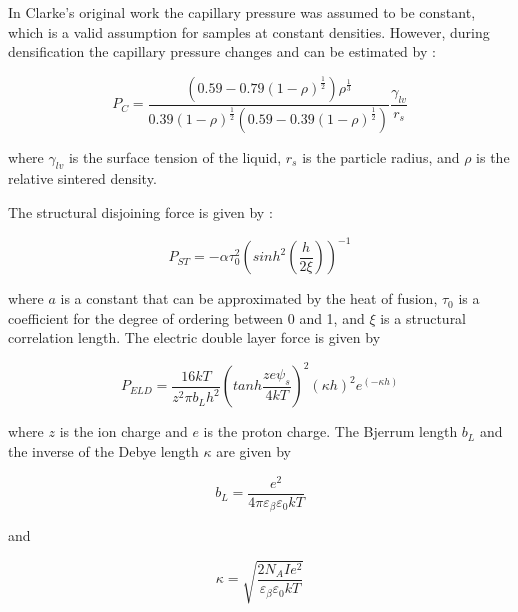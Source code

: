 In Clarke's original work the capillary pressure was assumed to be constant, which is a valid assumption for samples at constant densities. However, during densification the capillary pressure changes and can be estimated by \cite{Kwon1991}:

\begin{equation}
\label{Ch4-eq: eq6}
P_{C} = \frac{\left( 0.59-0.79 \left(1-\rho \right)^{\frac{1}{2}} \right) \rho^{\frac{1}{3}}}{0.39 \left(1-\rho \right)^{\frac{1}{2}} \left(0.59-0.39 \left(1-\rho \right)^{\frac{1}{2}} \right)} \frac{\gamma_{lv}}{r_{s}}
\end{equation}

\noindent where $\gamma_{lv}$ is the surface tension of the liquid, $r_{s}$ is the particle radius, and $\rho$ is the relative sintered density.

The structural disjoining force is given by \cite{Clarke1987}:

\begin{equation}
\label{Ch4-eq: eq7}
P_{ST} = - \alpha \tau_{0}^{2} \left( sinh^{2} \left( \frac{h}{2 \xi} \right) \right)^{-1}
\end{equation}

\noindent where $a$ is a constant that can be approximated by the heat of fusion, $\tau_{0}$ is a coefficient for the degree of ordering between 0 and 1, and $\xi$ is a structural correlation length.
The electric double layer force is given by \cite{Clarke1993}

\begin{equation}
\label{Ch4-eq: eq8}
P_{ELD} = \frac{16kT}{z^{2} \pi b_{L} h^{2}} \left( tanh \frac{ze \psi_{s}}{4kT} \right)^{2} (\kappa h)^{2} e^{(- \kappa h)}
\end{equation}
	
\noindent where $z$ is the ion charge and $e$ is the proton charge. The Bjerrum length $b_{L}$ and the inverse of the Debye length $\kappa$ are given by \cite{Clarke1993}
	
\begin{equation}
\label{Ch4-eq: eq9}
b_{L}= \frac{e^{2}}{4 \pi \varepsilon_{\beta} \varepsilon_{0} kT}
\end{equation}
	
\noindent and \cite{Israelachvili2011}
	
\begin{equation}
\label{Ch4-eq: eq10}
\kappa = \sqrt{\frac{2 N_{A} I e^{2}}{\varepsilon_{\beta} \varepsilon_{0} kT}}
\end{equation}

